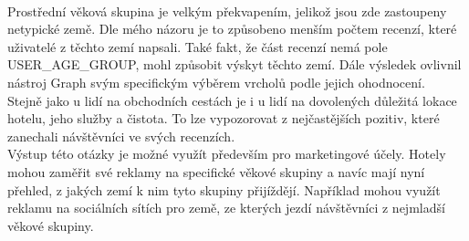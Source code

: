 \documentclass[czech,BP]{thesiskiv}
\begin{document}
\\
Prostřední věková skupina je velkým překvapením, jelikož jsou zde zastoupeny netypické země. Dle mého názoru je to způsobeno menším počtem recenzí, které uživatelé z těchto zemí napsali. Také fakt, že část recenzí nemá pole USER\_AGE\_GROUP, mohl způsobit výskyt těchto zemí. Dále výsledek ovlivnil nástroj Graph svým specifickým výběrem vrcholů podle jejich ohodnocení. 
\\
Stejně jako u lidí na obchodních cestách je i u lidí na dovolených důležitá lokace hotelu, jeho služby a čistota. To lze vypozorovat z nejčastějších pozitiv, které zanechali návštěvníci ve svých recenzích.
\\
Výstup této otázky je možné využít především pro marketingové účely. Hotely mohou zaměřit své reklamy na specifické věkové skupiny a navíc mají nyní přehled, z jakých zemí k nim tyto skupiny přijíždějí. Například mohou využít reklamu na sociálních sítích pro země, ze kterých jezdí návštěvníci z nejmladší věkové skupiny.
\end{document}
